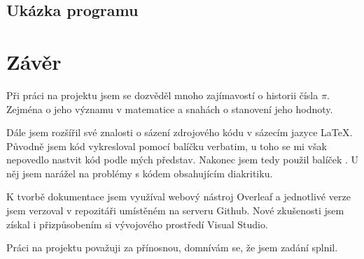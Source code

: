 \documentclass[11pt,a4paper,twoside,openright]{report}
\let\openright=\cleardoublepage
\begin{document}
	\section{Ukázka programu}
	\chapter*{Závěr}
	\pagestyle{empty}
	Při práci na projektu jsem se dozvěděl mnoho zajímavostí o historii čísla $\pi$. Zejména o jeho významu v matematice a snahách o stanovení jeho hodnoty. 
	
	Dále jsem rozšířil své znalosti o sázení zdrojového kódu v sázecím jazyce \LaTeX. Původně jsem kód vykresloval pomocí balíčku verbatim, u toho se mi však nepovedlo nastvit kód podle mých představ. Nakonec jsem tedy použil balíček . U něj jsem narážel na problémy s kódem obsahujícím diakritiku.
	
	K tvorbě dokumentace jsem využíval webový nástroj Overleaf a jednotlivé verze jsem verzoval v repozitáři umístěném na serveru Github. Nové zkušenosti jsem získal i přizpůsobením si vývojového prostředí Visual Studio.
	
	Práci na projektu považuji za přínosnou, domnívám se, že jsem zadání splnil.

	\nocite{dokumentace}
	\nocite{medium}
	\nocite{citace}
	\nocite{Historie_pi}
	\nocite{wiki:pi}
	\nocite{zvyrazneni_kodu}
	\nocite{clisting}
	\printbibliography[title={Seznam použité literatury},heading={bibintoc}]
	
	\openright
	\listoffigures
	
	\clearpage
	\listoftables
	\lstlistoflistings
	
	
	
\end{document}
